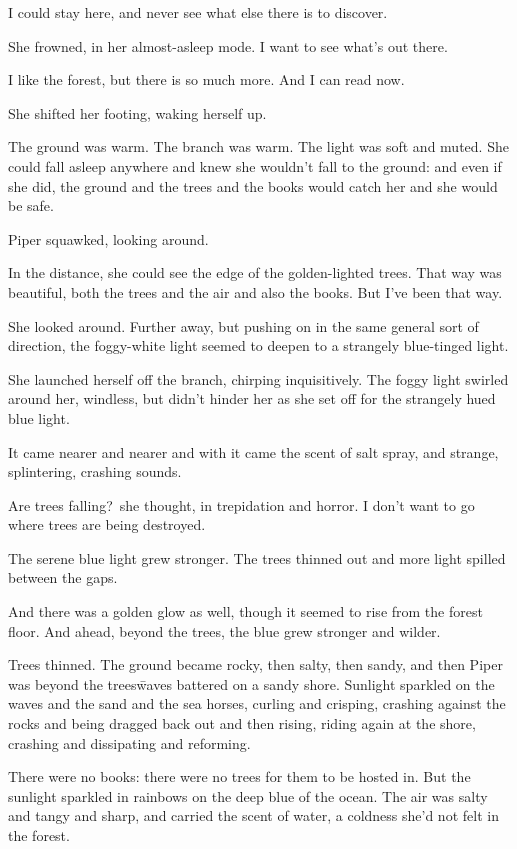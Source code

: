 I could stay here, and never see what else there is to discover.

She frowned, in her almost-asleep mode. I want to see what's out there.

I like the forest, but there is so much more. And I can read now.

She shifted her footing, waking herself up.

The ground was warm. The branch was warm. The light was soft and
muted. She could fall asleep anywhere and knew she wouldn't fall to
the ground: and even if she did, the ground and the trees and the
books would catch her and she would be safe.

Piper squawked, looking around.

In the distance, she could see the edge of the golden-lighted
trees. That way was beautiful, both the trees and the air and also the
books. But I've been that way.

She looked around. Further away, but pushing on in the same general
sort of direction, the foggy-white light seemed to deepen to a
strangely blue-tinged light.

She launched herself off the branch, chirping inquisitively. The foggy
light swirled around her, windless, but didn't hinder her as she set
off for the strangely hued blue light.

It came nearer and nearer and with it came the scent of salt spray,
and strange, splintering, crashing sounds.

Are trees falling?~she thought, in trepidation and horror. I don't want
to go where trees are being destroyed.

The serene blue light grew stronger. The trees thinned out and more
light spilled between the gaps.

And there was a golden glow as well, though it seemed to rise from the
forest floor. And ahead, beyond the trees, the blue grew stronger and
wilder.

Trees thinned. The ground became rocky, then salty, then sandy, and
then Piper was beyond the trees\=waves battered on a sandy
shore. Sunlight sparkled on the waves and the sand and the sea horses,
curling and crisping, crashing against the rocks and being dragged
back out and then rising, riding again at the shore, crashing and
dissipating and reforming.

There were no books: there were no trees for them to be hosted in. But
the sunlight sparkled in rainbows on the deep blue of the ocean. The
air was salty and tangy and sharp, and carried the scent of water, a
coldness she'd not felt in the forest.

